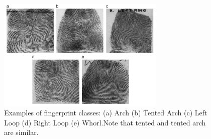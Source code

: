 \begin{figure}[!ht]
	\begin{center}
		\includegraphics[width=8cm]{fig/Fingerprint_classes.png}
	\end{center}
	\caption{Examples of fingerprint classes\cite{cao2013fingerprint}: (a) Arch (b) Tented Arch (c) Left Loop (d) Right Loop  (e) Whorl.Note  that tented and tented arch are similar.} 
	\label{fig.fingerprint_classes}
\end{figure}

